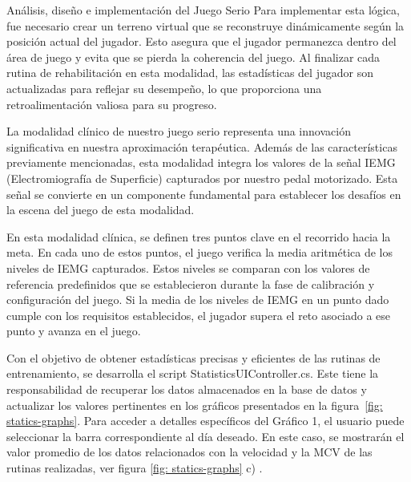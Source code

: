 \begin{thesischapter}{2} {Análisis, diseño e implementación del Juego Serio}
    \vspace{10pt}
    Para implementar esta lógica, fue necesario crear un terreno virtual que se reconstruye dinámicamente según la posición actual del jugador. Esto asegura que el jugador permanezca dentro del área de juego y evita que se pierda la coherencia del juego. Al finalizar cada rutina de rehabilitación en esta modalidad, las estadísticas del jugador son actualizadas para reflejar su desempeño, lo que proporciona una retroalimentación valiosa para su progreso.

    La modalidad clínico de nuestro juego serio representa una innovación significativa en nuestra aproximación terapéutica. Además de las características previamente mencionadas, esta modalidad integra los valores de la señal IEMG (Electromiografía de Superficie) capturados por nuestro pedal motorizado. Esta señal se convierte en un componente fundamental para establecer los desafíos en la escena del juego de esta modalidad.

    \vspace{10pt}
    En esta modalidad clínica, se definen tres puntos clave en el recorrido hacia la meta. En cada uno de estos puntos, el juego verifica la media aritmética de los niveles de IEMG capturados. Estos niveles se comparan con los valores de referencia predefinidos que se establecieron durante la fase de calibración y configuración del juego. Si la media de los niveles de IEMG en un punto dado cumple con los requisitos establecidos, el jugador supera el reto asociado a ese punto y avanza en el juego.


     
    Con el objetivo de obtener estadísticas precisas y eficientes de las rutinas de entrenamiento, se desarrolla el script StatisticsUIController.cs. 
    Este tiene la responsabilidad de recuperar los datos almacenados en la base de datos y actualizar los valores pertinentes en 
    los gráficos presentados en la figura~\ref{fig: statics-graphs}. Para acceder a detalles específicos del Gráfico 1, el usuario puede 
    seleccionar la barra correspondiente al día deseado. En este caso, se mostrarán el valor promedio %
    de los datos relacionados con la velocidad y la MCV de las rutinas realizadas, ver figura \ref{fig: statics-graphs} c)  .
    

\end{thesischapter}
